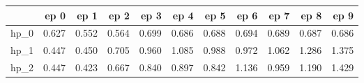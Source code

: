 \begin{tabular}{lrrrrrrrrrr}
\toprule
{} &   ep 0 &   ep 1 &   ep 2 &   ep 3 &   ep 4 &   ep 5 &   ep 6 &   ep 7 &   ep 8 &   ep 9 \\
\midrule
hp\_0 &  0.627 &  0.552 &  0.564 &  0.699 &  0.686 &  0.688 &  0.694 &  0.689 &  0.687 &  0.686 \\
hp\_1 &  0.447 &  0.450 &  0.705 &  0.960 &  1.085 &  0.988 &  0.972 &  1.062 &  1.286 &  1.375 \\
hp\_2 &  0.447 &  0.423 &  0.667 &  0.840 &  0.897 &  0.842 &  1.136 &  0.959 &  1.190 &  1.429 \\
\bottomrule
\end{tabular}
